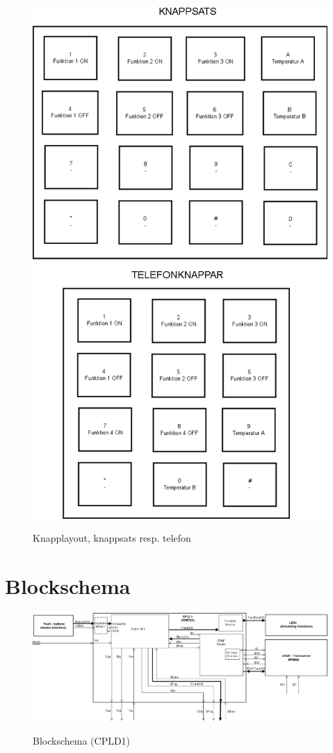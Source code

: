 \documentclass[a4paper,11pt]{article}
\begin{document}
		\begin{figure}[H]
		  \centering
		      \includegraphics[scale=0.40, angle=0]{UserInterface.png}
			\label{fig:UserInterface}
		  	\caption{Knapplayout, knappsats resp. telefon}
		\end{figure}

	\section{Blockschema}
		\label{sec:BlockAppendix}
		\begin{figure}[H]
		  \centering
		      \includegraphics[scale=0.36, angle=90]{BlockDiagramCPLD1.png}
			\label{fig:BlockDiagram1}
		  	\caption{Blockschema (CPLD1)}
		\end{figure}
\end{document}
